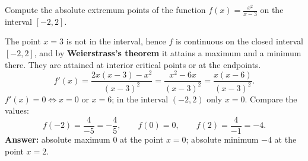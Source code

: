 
\begin{question}
Compute the absolute extremum points of the function $f(x)=\frac{x^2}{x-3}$ on the interval $[-2,2]$.
\end{question}

\begin{solution}
The point $x=3$ is not in the interval, hence $f$ is continuous on the closed interval $[-2,2]$, and by \textbf{Weierstrass's theorem} it attains a maximum and a minimum there. They are attained at interior critical points or at the endpoints.
\[ f'(x)=\frac{2x(x-3)-x^2}{(x-3)^2}=\frac{x^2-6x}{(x-3)^2}=\frac{x(x-6)}{(x-3)^2}. \]
$f'(x)=0\iff x=0$ or $x=6$; in the interval $(-2,2)$ only $x=0$. Compare the values:
\[ f(-2)=\frac{4}{-5}=-\frac45,\qquad f(0)=0,\qquad f(2)=\frac{4}{-1}=-4. \]
\textbf{Answer:} absolute maximum $0$ at the point $x=0$; absolute minimum $-4$ at the point $x=2$.
\end{solution}
